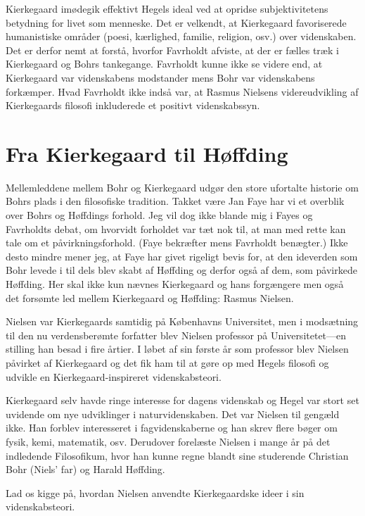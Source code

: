 \documentclass[12pt]{article}
\begin{document}
Kierkegaard imødegik effektivt Hegels ideal ved at opridse
subjektivitetens betydning for livet som menneske. Det er velkendt, at
Kierkegaard favoriserede humanistiske områder (poesi, kærlighed,
familie, religion, osv.) over videnskaben. Det er derfor nemt at forstå,
hvorfor Favrholdt afviste, at der er fælles træk i Kierkegaard og Bohrs
tankegange. Favrholdt kunne ikke se videre end, at Kierkegaard var
videnskabens modstander mens Bohr var videnskabens forkæmper. Hvad
Favrholdt ikke indså var, at Rasmus Nielsens videreudvikling af
Kierkegaards filosofi inkluderede et positivt videnskabssyn.

\hypertarget{fra-kierkegaard-til-huxf8ffding}{%
  \section{Fra Kierkegaard til
    Høffding}\label{fra-kierkegaard-til-huxf8ffding}}

Mellemleddene mellem Bohr og Kierkegaard udgør den store ufortalte
historie om Bohrs plads i den filosofiske tradition. Takket være Jan
Faye har vi et overblik over Bohrs og Høffdings forhold. Jeg vil dog
ikke blande mig i Fayes og Favrholdts debat, om hvorvidt forholdet var
tæt nok til, at man med rette kan tale om et påvirkningsforhold. (Faye
bekræfter mens Favrholdt benægter.) Ikke desto mindre mener jeg, at Faye
har givet rigeligt bevis for, at den ideverden som Bohr levede i til
dels blev skabt af Høffding og derfor også af dem, som påvirkede
Høffding. Her skal ikke kun nævnes Kierkegaard og hans forgængere men
også det forsømte led mellem Kierkegaard og Høffding: Rasmus Nielsen.

Nielsen var Kierkegaards samtidig på Københavns Universitet, men i
modsætning til den nu verdensberømte forfatter blev Nielsen professor på
Universitetet---en stilling han besad i fire årtier. I løbet af sin
første år som professor blev Nielsen påvirket af Kierkegaard og det fik
ham til at gøre op med Hegels filosofi og udvikle en
Kierkegaard-inspireret videnskabsteori.

Kierkegaard selv havde ringe interesse for dagens videnskab og Hegel var
stort set uvidende om nye udviklinger i naturvidenskaben. Det var
Nielsen til gengæld ikke. Han forblev interesseret i fagvidenskaberne og
han skrev flere bøger om fysik, kemi, matematik, osv. Derudover
forelæste Nielsen i mange år på det indledende Filosofikum, hvor han
kunne regne blandt sine studerende Christian Bohr (Niels' far) og Harald
Høffding.

Lad os kigge på, hvordan Nielsen anvendte Kierkegaardske ideer i sin
videnskabsteori.
\end{document}
